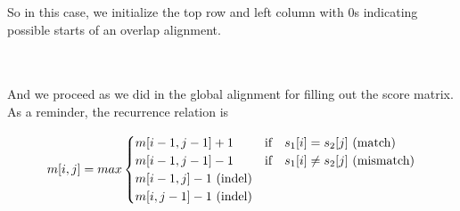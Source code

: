 \documentclass[11pt]{article}
\begin{document}
\noindent So in this case, we initialize the top row and left column with 0s indicating possible starts of an overlap alignment. \\ \\
\noindent
{} \\

And we proceed as we did in the global alignment for filling out the score matrix. As a reminder, the recurrence relation is

\begin{equation*}
m[i,j] = max
\begin{cases}
      m[i-1,j-1] + 1 & \text{if \,\, } s_1[i] = s_2[j] \text{ (match)} \\
      m[i-1,j-1] - 1 &  \text{if \,\, } s_1[i] \neq s_2[j] \text{ (mismatch)} \\
      m[i-1,j] - 1 \text{ (indel)} \\
      m[i,j-1] - 1 \text{ (indel)} \\
\end{cases}
\end{equation*}
\end{document}
